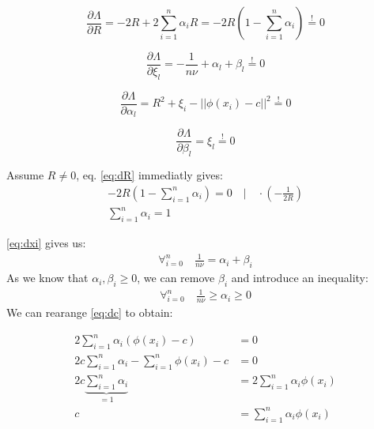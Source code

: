 \begin{equation}
    \label{eq:dR}
    \frac{\partial \Lambda}{\partial R} =
        - 2 R + 2 \sum_{i=1}^n \alpha_i R =
        - 2 R \left( 1 - \sum_{i=1}^n \alpha_i \right) \stackrel{!}{=} 0
\end{equation}

\begin{equation}
    \label{eq:dxi}
    \frac{\partial \Lambda}{\partial \xi_l} =
        - \frac{1}{n \nu} + \alpha_l + \beta_l \stackrel{!}{=} 0
\end{equation}

\begin{equation}
    \label{eq:dalpha}
    \frac{\partial \Lambda}{\partial \alpha_l} =
        R^2 +  \xi_i - || \phi(x_i) - c||^2  \stackrel{!}{=} 0
\end{equation}

\begin{equation}
    \label{eq:dbeta}
    \frac{\partial \Lambda}{\partial \beta_l} =
        \xi_l \stackrel{!}{=} 0
\end{equation}

Assume $R \neq 0$, eq. \eqref{eq:dR} immediatly gives:
\begin{align}
    - 2 R \left( 1 - \sum_{i=1}^n \alpha_i \right) = 0  \quad | \quad \cdot \left( - \frac{1}{2 R} \right) \\
    \sum_{i=1}^n \alpha_i  = 1
\end{align}

\eqref{eq:dxi} gives us:
\begin{align}
    \label{eq:n_eq_alpha_beta}
    \forall_{i=0}^n \quad \frac{1}{n \nu} =  \alpha_i + \beta_i
\end{align}
As we know that $\alpha_i, \beta_i  \ge 0 $, we can remove $\beta_i$ and
introduce an inequality:
\begin{align}
    \label{eq:}
    \forall_{i=0}^n \quad \frac{1}{n \nu} \ge  \alpha_i \ge 0
\end{align}
We can rearange \eqref{eq:dc} to obtain:

\begin{align}
    2 \sum_{i=1}^n \alpha_i \left(\phi(x_i) - c \right) &= 0 \\
    2 c \sum_{i=1}^n \alpha_i  - \sum_{i=1}^n \phi(x_i) - c  &= 0 \\
     2 c \underbrace{\sum_{i=1}^n \alpha_i}_{=1}  &= 2 \sum_{i=1}^n \alpha_i \phi(x_i)    \\
     c &= \sum_{i=1}^n \alpha_i \phi(x_i)
\end{align}


